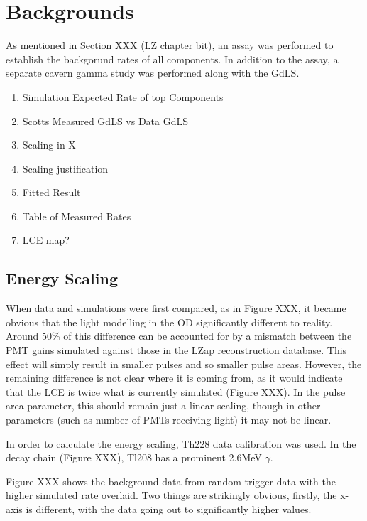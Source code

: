 \section{Backgrounds}
\par
As mentioned in Section XXX (LZ chapter bit), an assay was performed to establish the backgorund rates of all components.
In addition to the assay, a separate cavern gamma study was performed along with the GdLS.

\begin{tcolorbox}[colback=red!5!white, colframe=red!50!black, title=Key Plots]
\begin{enumerate}
    \item Simulation Expected Rate of top Components
    \item Scotts Measured GdLS vs Data GdLS
    \item Scaling in X
    \item Scaling justification
    \item Fitted Result
    \item Table of Measured Rates
    \item LCE map?
\end{enumerate}
\end{tcolorbox}


\subsection{Energy Scaling}
\par
When data and simulations were first compared, as in Figure XXX, it became obvious that the light modelling in the OD significantly different to reality.
Around 50\% of this difference can be accounted for by a mismatch between the PMT gains simulated against those in the LZap reconstruction database.
This effect will simply result in smaller pulses and so smaller pulse areas.
However, the remaining difference is not clear where it is coming from, as it would indicate that the LCE is twice what is currently simulated (Figure XXX).
In the pulse area parameter, this should remain just a linear scaling, though in other parameters (such as number of PMTs receiving light) it may not be linear.

\par
In order to calculate the energy scaling, Th228 data calibration was used. 
In the decay chain (Figure XXX), Tl208 has a prominent 2.6MeV $\gamma$. 


Figure XXX shows the background data from random trigger data with the higher simulated rate overlaid.
Two things are strikingly obvious, firstly, the x-axis is different, with the data going out to significantly higher values.
